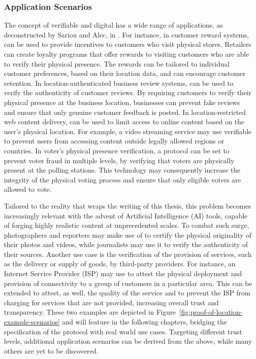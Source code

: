 \subsubsection{Application Scenarios}
\label{sec:background-proof-of-location-application-scenarios}

The concept of verifiable and digital \pol{} has a wide range of applications, as deconstructed by Sariou and Alec, in \cite{saroiu2009enabling}. For instance, in customer reward systems, \pol{} can be used to provide incentives to customers who visit physical stores. Retailers can create loyalty programs that offer rewards to visiting customers who are able to verify their physical presence. The rewards can be tailored to individual customer preferences, based on their location data, and can encourage customer retention. In location-authenticated business review systems, \pol{} can be used to verify the authenticity of customer reviews. By requiring customers to verify their physical presence at the business location, businesses can prevent fake reviews and ensure that only genuine customer feedback is posted. In location-restricted web content delivery, \pol{} can be used to limit access to online content based on the user's physical location. For example, a video streaming service may use verifiable \pol{} to prevent users from accessing content outside legally allowed regions or countries. In voter's physical presence verification, a \pol{} protocol can be set to prevent voter fraud in multiple levels, by verifying that voters are physically present at the polling stations. This technology may consequently increase the integrity of the physical voting process and ensure that only eligible voters are allowed to vote.

Tailored to the reality that wraps the writing of this thesis, this problem becomes increasingly relevant with the advent of Artificial Intelligence (AI) tools, capable of forging highly realistic content at unprecedented scales. To combat such surge, photographers and reporters may make use of \pol{} to certify the physical originality of their photos and videos, while journalists may use it to verify the authenticity of their sources. Another use case is the verification of the provision of services, such as the delivery or supply of goods, by third-party providers. For instance, an Internet Service Provider (ISP) may use \pol{} to attest the physical deployment and provision of connectivity to a group of customers in a particular area. This can be extended to attest, as well, the quality of the service and to prevent the ISP from charging for services that are not provided, increasing overall trust and transparency. These two examples are depicted in Figure~\ref{fig:proof-of-location-example-scenarios} and will feature in the following chapters, bridging the specification of the \pol{} protocol with real world use cases. Targeting different trust levels, additional application scenarios can be derived from the above, while many others are yet to be discovered. 


